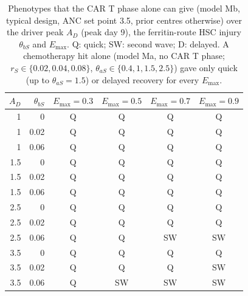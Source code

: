 \begin{table}[!htbp]
\centering
\small
\setlength{\tabcolsep}{3.5pt}
\caption{Phenotypes that the CAR T phase alone can give (model Mb, typical design, ANC set point 3.5, prior centres otherwise) over the driver peak $A_D$ (peak day 9), the ferritin-route HSC injury $\theta_{bS}$ and $E_{\max}$. Q: quick; SW: second wave; D: delayed. A chemotherapy hit alone (model Ma, no CAR T phase; $r_S\in\{0.02,0.04,0.08\}$, $\theta_{aS}\in\{0.4,1,1.5,2.5\}$) gave only quick (up to $\theta_{aS}=1.5$) or delayed recovery for every $E_{\max}$.}
\label{tab:screen}
\begin{tabular}{rrcccc}
\toprule
$A_D$ & $\theta_{bS}$ & $E_{\max}=0.3$ & $E_{\max}=0.5$ & $E_{\max}=0.7$ & $E_{\max}=0.9$ \\
\midrule
1 & 0 & Q & Q & Q & Q \\
1 & 0.02 & Q & Q & Q & Q \\
1 & 0.06 & Q & Q & Q & Q \\
1.5 & 0 & Q & Q & Q & Q \\
1.5 & 0.02 & Q & Q & Q & Q \\
1.5 & 0.06 & Q & Q & Q & Q \\
2.5 & 0 & Q & Q & Q & Q \\
2.5 & 0.02 & Q & Q & Q & Q \\
2.5 & 0.06 & Q & Q & SW & SW \\
3.5 & 0 & Q & Q & Q & Q \\
3.5 & 0.02 & Q & Q & Q & SW \\
3.5 & 0.06 & Q & SW & SW & SW \\
\bottomrule
\end{tabular}
\end{table}
